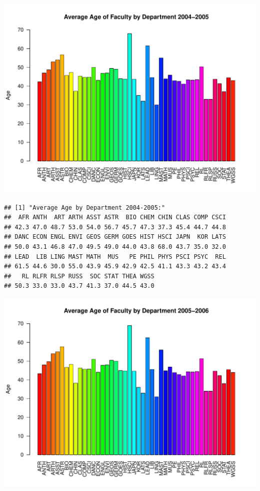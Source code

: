 \documentclass[12pt,a4paper]{article}\usepackage[]{graphicx}\usepackage[]{color}
\makeatletter
\def\maxwidth{ %
  \ifdim\Gin@nat@width>\linewidth
    \linewidth
  \else
    \Gin@nat@width
  \fi
}
\newenvironment{kframe}{%
 \def\at@end@of@kframe{}%
 \ifinner\ifhmode%
  \def\at@end@of@kframe{\end{minipage}}%
  \begin{minipage}{\columnwidth}%
 \fi\fi%
 \def\FrameCommand##1{\hskip\@totalleftmargin \hskip-\fboxsep
 \colorbox{shadecolor}{##1}\hskip-\fboxsep
     \hskip-\linewidth \hskip-\@totalleftmargin \hskip\columnwidth}%
 \MakeFramed {\advance\hsize-\width
   \@totalleftmargin\z@ \linewidth\hsize
   \@setminipage}}%
 {\par\unskip\endMakeFramed%
 \at@end@of@kframe}
\newenvironment{knitrout}{}{} %
\theoremstyle{definition}
\makeatother
\begin{document}
\begin{knitrout}
\color{fgcolor}
\includegraphics[width=\maxwidth]{figure/unnamed-chunk-10-1} 
\begin{kframe}\begin{verbatim}
## [1] "Average Age by Department 2004-2005:"
##  AFR ANTH  ART ARTH ASST ASTR  BIO CHEM CHIN CLAS COMP CSCI 
## 42.3 47.0 48.7 53.0 54.0 56.7 45.7 47.3 37.3 45.4 44.7 44.8 
## DANC ECON ENGL ENVI GEOS GERM GOES HIST HSCI JAPN  KOR LATS 
## 50.0 43.1 46.8 47.0 49.5 49.0 44.0 43.8 68.0 43.7 35.0 32.0 
## LEAD  LIB LING MAST MATH  MUS   PE PHIL PHYS PSCI PSYC  REL 
## 61.5 44.6 30.0 55.0 43.9 45.9 42.9 42.5 41.1 43.3 43.2 43.4 
##   RL RLFR RLSP RUSS  SOC STAT THEA WGSS 
## 50.3 33.0 33.0 43.7 41.3 37.0 44.5 43.0
\end{verbatim}
\end{kframe}
\includegraphics[width=\maxwidth]{figure/unnamed-chunk-10-2} 

\end{knitrout}
\end{document}
